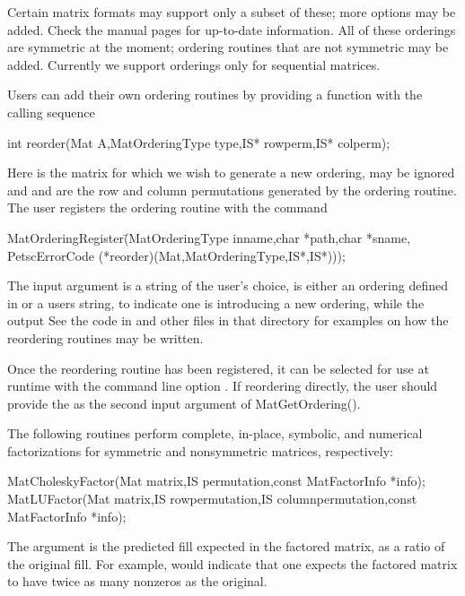 {{{Certain matrix formats may support only a subset of these; more options may
be added. Check the manual pages for up-to-date information. All of these orderings are
symmetric at the moment; ordering routines that are
not symmetric may be added. Currently we support orderings only for
sequential matrices.

Users can add their own ordering routines
by providing a function with the calling sequence
\begin{tabbing}
   int reorder(Mat A,MatOrderingType type,IS* rowperm,IS* colperm);
\end{tabbing}
Here  is the matrix for which we wish to generate a new ordering,
 may be ignored and  and  are the row
and column permutations generated by the ordering routine.
The user registers the ordering routine
with the command
\begin{tabbing}
  MatOrderingRegister\=(MatOrderingType inname,char *path,char *sname,\\
                             \>PetscErrorCode (*reorder)(Mat,MatOrderingType,IS*,IS*)));
\end{tabbing}
The  
input argument  is a string of the user's choice,  is either
an ordering defined in  or a users string,
to indicate one is introducing a new ordering, while the output
See the code in  and other files in that
directory for examples on how the reordering routines may be written.

Once the reordering routine has been registered,
it can be selected for use at runtime with the
command line option  .  If reordering directly,
the user should provide the  as the second input argument of
MatGetOrdering().

The following routines perform complete, in-place, symbolic, and numerical
factorizations for symmetric and nonsymmetric matrices, respectively:
\begin{tabbing}
  MatCholeskyFactor(Mat matrix,IS permutation,const MatFactorInfo *info);\\
  MatLUFactor(Mat matrix,IS rowpermutation,IS columnpermutation,const MatFactorInfo *info);
\end{tabbing}
The argument  is the predicted fill
expected in the factored matrix, as a ratio of the original fill.
For example,  would indicate that one expects the factored
matrix to have twice as many nonzeros as the original.

}}}
